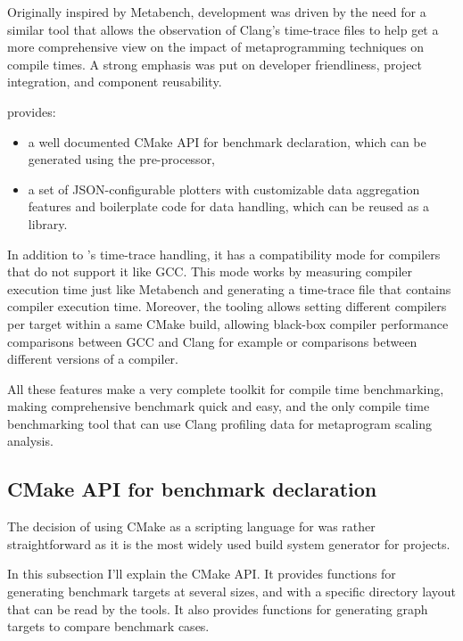 \documentclass[../../main.tex]{subfiles}
\begin{document}
Originally inspired by Metabench\cite{metabench}, \ctbench development was
driven by the need for a similar tool that allows the observation of Clang's
time-trace files to help get a more comprehensive view on the impact of
metaprogramming techniques on compile times. A strong emphasis was put on
developer friendliness, project integration, and component reusability.

\ctbench provides:

\begin{itemize}
\item a well documented CMake API for benchmark declaration, which can be
      generated using the \cpp pre-processor,
\item a set of JSON-configurable plotters with customizable data aggregation
      features and boilerplate code for data handling, which can be reused as a
      \cpp library.
\end{itemize}

In addition to \ctbench's time-trace handling, it has a compatibility mode
for compilers that do not support it like GCC. This mode works by measuring
compiler execution time just like Metabench\cite{metabench} and generating a
time-trace file that contains compiler execution time. Moreover, the tooling
allows setting different compilers per target within a same CMake build,
allowing black-box compiler performance comparisons between GCC and Clang for
example or comparisons between different versions of a compiler.

All these features make \ctbench a very complete toolkit for compile time
benchmarking, making comprehensive benchmark quick and easy, and the only
compile time benchmarking tool that can use Clang profiling data for metaprogram
scaling analysis.

\subsection{CMake API for benchmark declaration}

The decision of using CMake as a scripting language for \ctbench was rather
straightforward as it is the most widely used build system generator for \cpp
projects.

In this subsection I'll explain the CMake API. It provides functions for
generating benchmark targets at several sizes, and with a specific directory
layout that can be read by the \grapher tools. It also provides functions for
generating graph targets to compare benchmark cases.
\end{document}
